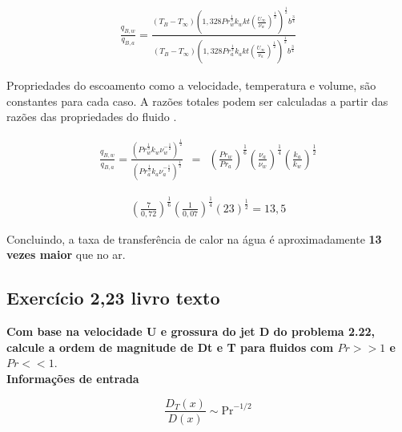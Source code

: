 \documentclass[12pt]{article}
\begin{document}
\begin{equation}
	\begin{aligned}
		\frac{q_{B,w}}{q_{B,a}} = \frac{(T_{B} - T_{\infty})\left(1,328Pr^{\frac{1}{3}}_{w}k_{w}kt\left(\frac{U_{\infty}}{\nu_{w}}\right)^{\frac{1}{2}}\right)^{\frac{1}{2}} b^{\frac{3}{4}} }{(T_{B} - T_{\infty})\left(1,328Pr^{\frac{1}{3}}_{a}k_{a}kt\left(\frac{U_{\infty}}{\nu_{a}}\right)^{\frac{1}{2}}\right)^{\frac{1}{2}} b^{\frac{3}{4}} }
	\end{aligned}
\end{equation}

Propriedades do escoamento como a velocidade, temperatura e volume, são constantes para cada caso. A razões totales podem ser calculadas a partir das razões das propriedades do fluido                    .

\begin{equation}
	\begin{aligned}
		\frac{q_{B,w}}{q_{B,a}} = \frac{\left(Pr^{\frac{1}{3}}_{w}k_{w} \nu^{-\frac{1}{2}}_{w}\right)^{\frac{1}{2}}  }{\left(Pr^{\frac{1}{3}}_{a}k_{a}\nu^{-\frac{1}{2}}_{a}\right)^{\frac{1}{2}}  }\ \ = \ \ \left( \frac{Pr_{w}}{Pr_{a}}\right)^{\frac{1}{6}} \left( \frac{\nu_{a}}{\nu_{w}}\right)^{\frac{1}{4}} \left( \frac{k_{a}}{k_{w}}\right)^{\frac{1}{2}}
	\end{aligned}
\end{equation}

\begin{equation}
	\begin{aligned}
		 \left( \frac{7}{0,72}\right)^{\frac{1}{6}} \left( {\frac{1}{0,07}}\right)^{\frac{1}{4}} \left( 23\right)^{\frac{1}{2}} = 13,5
	\end{aligned}
\end{equation}

Concluindo, a taxa de transferência de calor na água é aproximadamente \textbf{13 vezes maior} que no ar.

\subsection*{Exercício 2,23 livro texto}


\textbf{Com base na velocidade U e grossura do jet D do problema 2.22, calcule a ordem de magnitude de Dt e T para fluidos com $Pr >> 1$ e $Pr << 1$}. \\

\textbf{Informações de entrada}

\begin{equation}
	\frac{D_T(x)}{D(x)} \sim \text{Pr}^{-1/2}
\end{equation}
\end{document}
